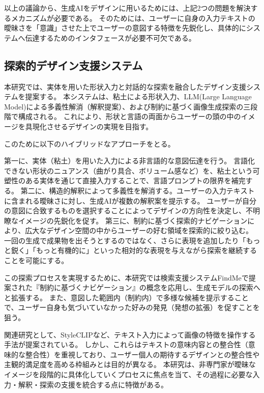 \documentclass{kuisthesis}
\begin{document}
以上の議論から、生成AIをデザインに用いるためには、上記2つの問題を解決するメカニズムが必要である。
そのためには、ユーザーに自身の入力テキストの曖昧さを「意識」させた上でユーザーの意図する特徴を先鋭化し、具体的にシステムへ伝達するためのインタフェースが必要不可欠である。

\subsection{探索的デザイン支援システム}
本研究では、実体を用いた形状入力と対話的な探索を融合したデザイン支援システムを提案する。
本システムは、粘土による形状入力、LLM(Large Language Model)による多義性解消（解釈提案）、および制約に基づく画像生成探索の三段階で構成される。
これにより、形状と言語の両面からユーザーの頭の中のイメージを具現化させるデザインの実現を目指す。

このために以下のハイブリッドなアプローチをとる。

第一に、実体（粘土）を用いた入力による非言語的な意図伝達を行う。
言語化できない形状のニュアンス（曲がり具合、ボリューム感など）を、粘土という可塑性のある実体を通じて直接入力することで、言語プロンプトの限界を補完する。
第二に、構造的解釈によって多義性を解消する。ユーザーの入力テキストに含まれる曖昧さに対し、生成AIが複数の解釈案を提示する。
ユーザーが自分の意図に合致するものを選択することによってデザインの方向性を決定し、不明瞭なイメージの先鋭化を促す。
第三に、制約に基づく探索的ナビゲーションにより、広大なデザイン空間の中からユーザーの好む領域を探索的に絞り込む。
一回の生成で成果物を出そうとするのではなく、さらに表現を追加したり「もっと鋭く」「もっと有機的に」といった相対的な表現を与えながら探索を継続することを可能にする。

この探索プロセスを実現するために、本研究では検索支援システムFindMeで提案された『制約に基づくナビゲーション』の概念\cite{burke2002}を応用し、生成モデルの探索へと拡張する。
また、意図した範囲内（制約内）で多様な候補を提示することで、ユーザー自身も気づいていなかった好みの発見（発想の拡張）を促すことを狙う。

関連研究として、StyleCLIP\cite{patashnik2021}など、テキスト入力によって画像の特徴を操作する手法が提案されている。
しかし、これらはテキストの意味内容との整合性（意味的な整合性）を重視しており、ユーザー個人の期待するデザインとの整合性や主観的満足度を高める枠組みとは目的が異なる。
本研究は、非専門家が曖昧なイメージを段階的に具体化していくプロセスに焦点を当て、その過程に必要な入力・解釈・探索の支援を統合する点に特徴がある。



\end{document}
